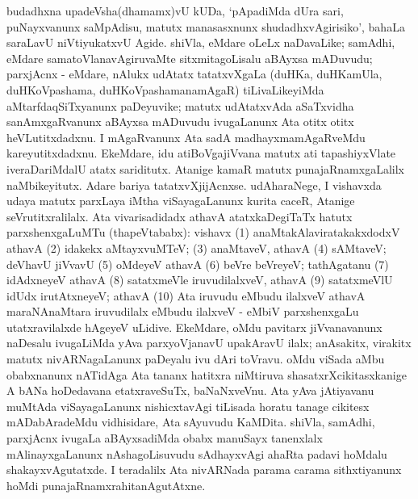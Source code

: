 budadhxna upadeVsha(dhamamx)vU kUDa, `pApadiMda dUra sari, puNayxvanunx saMpAdisu, matutx manasasxnunx shudadhxvAgirisiko', bahaLa saraLavU niVtiyukatxvU Agide. shiVla, eMdare oLeLx naDavaLike; samAdhi, eMdare samatoVlanavAgiruvaMte sitxmitagoLisalu aBAyxsa mADuvudu; parxjAcnx - eMdare, nAlukx udAtatx tatatxvXgaLa (duHKa, duHKamUla, duHKoVpashama, duHKoVpashamanamAgaR) tiLivaLikeyiMda aMtarfdaqSiTxyanunx paDeyuvike; matutx udAtatxvAda aSaTxvidha sanAmxgaRvanunx aBAyxsa mADuvudu ivugaLanunx Ata otitx otitx heVLutitxdadxnu. I mAgaRvanunx Ata sadA madhayxmamAgaRveMdu kareyutitxdadxnu. EkeMdare, idu atiBoVgajiVvana matutx ati tapashiyxVlate iveraDariMdalU atatx sariditutx. Atanige kamaR matutx punajaRnamxgaLalilx naMbikeyitutx. Adare bariya tatatxvXjijAcnxse. udAharaNege, I vishavxda udaya matutx parxLaya iMtha viSayagaLanunx kurita caceR, Atanige seVrutitxralilalx. Ata vivarisadidadx athavA atatxkaDegiTaTx hatutx parxshenxgaLuMTu (thapeVtababx): vishavx 
(1) anaMtakAlaviratakakxdodxV athavA
(2) idakekx aMtayxvuMTeV;
(3) anaMtaveV, athavA
(4) sAMtaveV; deVhavU jiVvavU
(5) oMdeyeV athavA 
(6) beVre beVreyeV; tathAgatanu
(7) idAdxneyeV athavA
(8) satatxmeVle iruvudilalxveV, athavA 
(9) satatxmeVlU idUdx irutAtxneyeV; athavA 
(10) Ata iruvudu eMbudu ilalxveV athavA maraNAnaMtara iruvudilalx eMbudu ilalxveV - eMbiV parxshenxgaLu utatxravilalxde hAgeyeV uLidive. EkeMdare, oMdu pavitarx jiVvanavanunx naDesalu ivugaLiMda yAva parxyoVjanavU upakAravU ilalx; anAsakitx, virakitx matutx nivARNagaLanunx paDeyalu ivu dAri toVravu. oMdu viSada aMbu obabxnanunx nATidAga Ata tananx hatitxra niMtiruva shasatxrXcikitasxkanige A bANa hoDedavana etatxraveSuTx, baNaNxveVnu. Ata yAva jAtiyavanu muMtAda viSayagaLanunx nishicxtavAgi tiLisada horatu tanage cikitesx mADabAradeMdu vidhisidare, Ata sAyuvudu KaMDita. shiVla, samAdhi, parxjAcnx ivugaLa aBAyxsadiMda obabx manuSayx tanenxlalx mAlinayxgaLanunx nAshagoLisuvudu sAdhayxvAgi ahaRta padavi hoMdalu shakayxvAgutatxde. I teradalilx Ata nivARNada parama carama sithxtiyanunx hoMdi punajaRnamxrahitanAgutAtxne.

